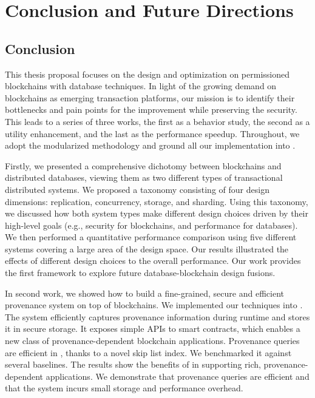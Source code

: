 
\chapter{Conclusion and Future Directions}
\label{ch:conclu}
\section{Conclusion}
This thesis proposal focuses on the design and optimization on permissioned blockchains with database techniques. 
In light of the growing demand on blockchains as emerging transaction platforms, 
our mission is to identify their bottlenecks and pain points for the improvement while preserving the security.
This leads to a series of three works, the first as a behavior study, the second as a utility enhancement, and the last as the performance speedup. 
Throughout, we adopt the modularized methodology and ground all our implementation into {\fs}. 

Firstly, we presented a comprehensive dichotomy between blockchains and distributed databases, viewing them as two different types of transactional distributed systems. We proposed a taxonomy consisting of four design dimensions: replication, concurrency, storage, and sharding. Using this taxonomy, we discussed how both system types make different design choices driven by their high-level goals (e.g., security for blockchains, and performance for databases). We then performed a quantitative performance comparison using five different systems covering a large area of the design space. Our results illustrated the effects of different design choices to the overall performance. Our work provides the first framework to explore future database-blockchain design fusions. 

In second work, we showed how to build a fine-grained,
secure and efficient provenance system on top of blockchains. 
We implemented our techniques into {\fs}.
The system efficiently captures provenance information during runtime and stores it in secure storage. 
It exposes simple APIs to smart contracts, which enables a new class of provenance-dependent blockchain applications. 
Provenance queries are efficient in {\fs}, thanks to a novel skip
list index. We benchmarked it against several baselines. The results show the benefits of {\fs} in supporting rich,
provenance-dependent applications. We demonstrate that
provenance queries are efficient and that the system incurs
small storage and performance overhead.

